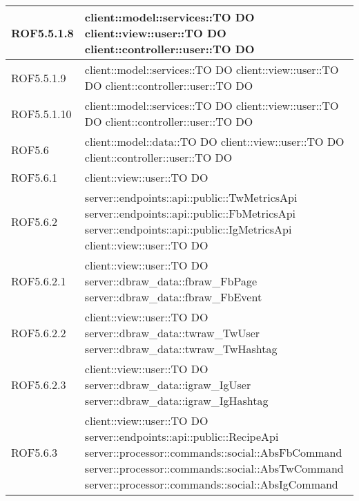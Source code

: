 \begin{center}
\begin{longtable}{| p{2.5cm} | p{11cm} |}
\hline
ROF5.5.1.8 & client::model::services::TO DO \newline client::view::user::TO DO \newline client::controller::user::TO DO \\
\hline
ROF5.5.1.9 & client::model::services::TO DO \newline client::view::user::TO DO \newline client::controller::user::TO DO \\
\hline
ROF5.5.1.10 & client::model::services::TO DO \newline client::view::user::TO DO \newline client::controller::user::TO DO \\
\hline
ROF5.6 & client::model::data::TO DO \newline client::view::user::TO DO \newline client::controller::user::TO DO \\
\hline
ROF5.6.1 & client::view::user::TO DO \\
\hline
ROF5.6.2 & server::endpoints::api::public::TwMetricsApi \newline server::endpoints::api::public::FbMetricsApi \newline server::endpoints::api::public::IgMetricsApi \newline client::view::user::TO DO \\
\hline
ROF5.6.2.1 & client::view::user::TO DO \newline server::dbraw\_data::fbraw\_FbPage \newline server::dbraw\_data::fbraw\_FbEvent \\
\hline
ROF5.6.2.2 & client::view::user::TO DO \newline server::dbraw\_data::twraw\_TwUser \newline server::dbraw\_data::twraw\_TwHashtag \\
\hline
ROF5.6.2.3 & client::view::user::TO DO \newline server::dbraw\_data::igraw\_IgUser \newline server::dbraw\_data::igraw\_IgHashtag \\
\hline
ROF5.6.3 & client::view::user::TO DO \newline server::endpoints::api::public::RecipeApi \newline server::processor::commands::social::AbsFbCommand \newline server::processor::commands::social::AbsTwCommand \newline server::processor::commands::social::AbsIgCommand\\

\end{longtable}
\end{center}
